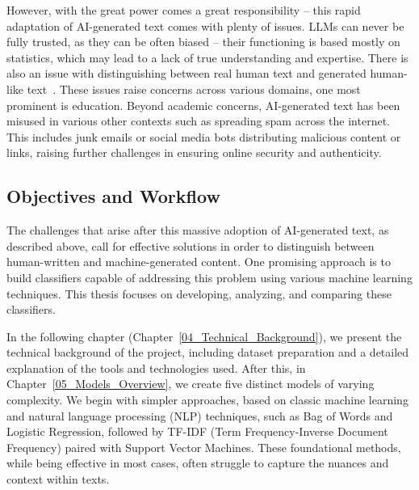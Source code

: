 \vspace{3mm}

However, with the great power comes a great responsibility -- this rapid adaptation of AI-generated text comes with plenty of issues. LLMs can never be fully trusted, as they can be often biased -- their functioning is based mostly on statistics, which may lead to a lack of true understanding and expertise. There is also an issue with distinguishing between real human text and generated human-like text~\cite{kasneci2023chatgpt}. These issues raise concerns across various domains, one most prominent is education. Beyond academic concerns, AI-generated text has been misused in various other contexts such as spreading spam across the internet. This includes junk emails or social media bots distributing malicious content or links, raising further challenges in ensuring online security and authenticity.

\vspace{3mm} 


\subsection*{Objectives and Workflow}

\vspace{3mm} 

The challenges that arise after this massive adoption of AI-generated text, as described above, call for effective solutions in order to distinguish between human-written and machine-generated content. One promising approach is to build classifiers capable of addressing this problem using various machine learning techniques. This thesis focuses on developing, analyzing, and comparing these classifiers. 

\vspace{3mm} 

In the following chapter (Chapter~\ref{04_Technical_Background}), we present the technical background of the project, including dataset preparation and a detailed explanation of the tools and technologies used. After this, in Chapter~\ref{05_Models_Overview}, we create five distinct models of varying complexity. We begin with simpler approaches, based on classic machine learning and natural language processing (NLP) techniques, such as Bag of Words and Logistic Regression, followed by TF-IDF (Term Frequency-Inverse Document Frequency) paired with Support Vector Machines. These foundational methods, while being effective in most cases, often struggle to capture the nuances and context within texts.

